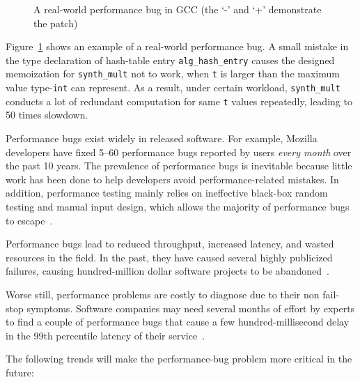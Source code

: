 \begin{figure}
\caption{A real-world performance bug in GCC (the `-' and `+' demonstrate the patch)}
\label{fig:GCC27733}
\end{figure}


Figure~\ref{fig:GCC27733} shows an example of a real-world performance bug.
A small mistake in the type declaration of hash-table entry \texttt{alg\_hash\_entry} 
causes the designed memoization for \texttt{synth\_mult} not to work, when \texttt{t}
is larger than the maximum value type-\texttt{int} can represent. 
As a result, under certain workload, \texttt{synth\_mult} conducts a lot of
redundant computation for same \texttt{t} values repeatedly, 
leading to 50 times slowdown. 

Performance bugs exist widely in released software. 
For example, Mozilla developers have fixed 5--60 performance bugs
reported by users {\it every month} over the past 10 years.
The prevalence of performance bugs is inevitable because
little work has been done to help developers avoid
performance-related mistakes. In addition,
performance testing mainly relies on ineffective black-box random 
testing and manual input design, which allows the majority of performance bugs
to escape~\citep{rily.perftest}.

Performance bugs lead to reduced throughput, increased latency, and 
wasted resources in the field. 
In the past, they have caused several 
highly publicized failures, causing hundred-million dollar software 
projects to be abandoned~\citep{colorado,uk}.

Worse still, performance problems are costly to 
diagnose due to their non fail-stop symptoms.
Software companies may need several months of effort by experts
to find a couple of performance bugs that cause a few 
hundred-millisecond delay in
the 99th percentile latency of their service~\citep{dicksites}.

The following trends will make the performance-bug problem more critical
in the future:


